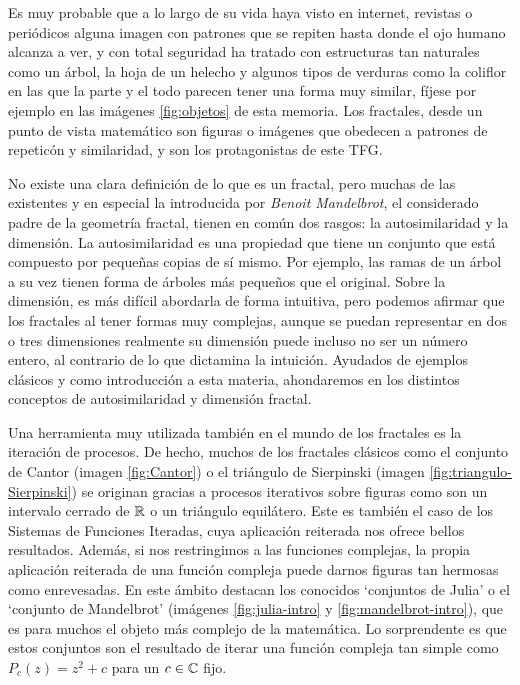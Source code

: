 
Es muy probable que a lo largo de su vida haya visto en internet, revistas o periódicos alguna imagen con patrones que se repiten hasta donde el ojo humano alcanza a ver, y con total seguridad ha tratado con estructuras tan naturales como un árbol, la hoja de un helecho y algunos tipos de verduras como la coliflor en las que la parte y el todo parecen tener una forma muy similar, fíjese por ejemplo en las imágenes \ref{fig:objetos} de esta memoria. Los fractales, desde un punto de vista matemático son figuras o imágenes que obedecen a patrones de repeticón y similaridad, y son los protagonistas de este TFG.

No existe una clara definición de lo que es un fractal, pero muchas de las existentes y en especial la introducida por \textit{Benoit Mandelbrot}, el considerado padre de la geometría fractal, tienen en común dos rasgos: la autosimilaridad y la dimensión. La autosimilaridad es una propiedad que tiene un conjunto que está compuesto por pequeñas copias de sí mismo. Por ejemplo, las ramas de un árbol a su vez tienen forma de árboles más pequeños que el original. Sobre la dimensión, es más difícil abordarla de forma intuitiva, pero podemos afirmar que los fractales al tener formas muy complejas, aunque se puedan representar en dos o tres dimensiones realmente su dimensión puede incluso no ser un número entero, al contrario de lo que dictamina la intuición. Ayudados de ejemplos clásicos y como introducción a esta materia, ahondaremos en los distintos conceptos de autosimilaridad y dimensión fractal.

Una herramienta muy utilizada también en el mundo de los fractales es la iteración de procesos. De hecho, muchos de los fractales clásicos como el conjunto de Cantor (imagen \ref{fig:Cantor}) o el triángulo de Sierpinski (imagen \ref{fig:triangulo-Sierpinski}) se originan gracias a procesos iterativos sobre figuras como son un intervalo cerrado de $\mathbb{R}$ o un triángulo equilátero. Este es también el caso de los Sistemas de Funciones Iteradas, cuya aplicación reiterada nos ofrece bellos resultados. Además, si nos restringimos a las funciones complejas, la propia aplicación reiterada de una función compleja puede darnos figuras tan hermosas como enrevesadas. En este ámbito destacan los conocidos `conjuntos de Julia' o el `conjunto de Mandelbrot' (imágenes \ref{fig:julia-intro} y \ref{fig:mandelbrot-intro}), que es para muchos el objeto más complejo de la matemática. Lo sorprendente es que estos conjuntos son el resultado de iterar una función compleja tan simple como $P_c(z)=z^2+c$ para un $c\in\mathbb{C}$ fijo. 

